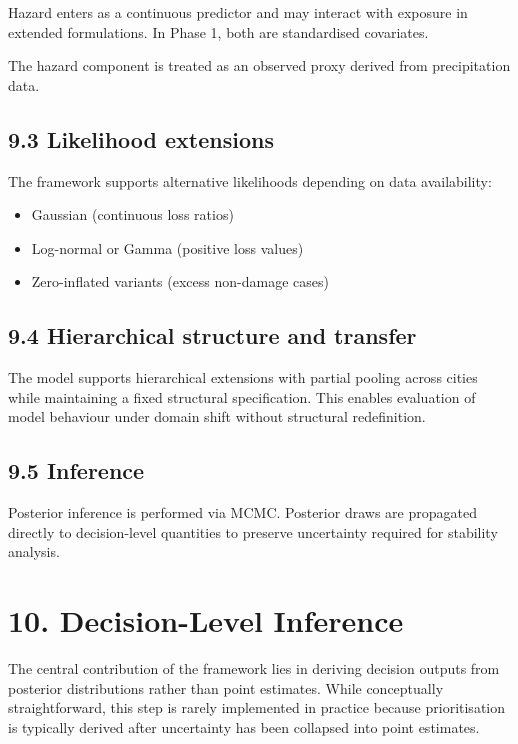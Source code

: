 \documentclass[
]{article}
\providecommand{\tightlist}{%
  \setlength{\itemsep}{0pt}\setlength{\parskip}{0pt}}
\begin{document}
Hazard enters as a continuous predictor and may interact with exposure
in extended formulations. In Phase 1, both are standardised covariates.

The hazard component is treated as an observed proxy derived from
precipitation data.

\subsection{9.3 Likelihood extensions}\label{likelihood-extensions}

The framework supports alternative likelihoods depending on data
availability:

\begin{itemize}
\tightlist
\item
  Gaussian (continuous loss ratios)
\item
  Log-normal or Gamma (positive loss values)
\item
  Zero-inflated variants (excess non-damage cases)
\end{itemize}

\subsection{9.4 Hierarchical structure and
transfer}\label{hierarchical-structure-and-transfer}

The model supports hierarchical extensions with partial pooling across
cities while maintaining a fixed structural specification. This enables
evaluation of model behaviour under domain shift without structural
redefinition.

\subsection{9.5 Inference}\label{inference}

Posterior inference is performed via MCMC. Posterior draws are
propagated directly to decision-level quantities to preserve uncertainty
required for stability analysis.

\section{10. Decision-Level Inference}\label{decision-level-inference}

The central contribution of the framework lies in deriving decision
outputs from posterior distributions rather than point estimates. While
conceptually straightforward, this step is rarely implemented in
practice because prioritisation is typically derived after uncertainty
has been collapsed into point estimates.
\end{document}
